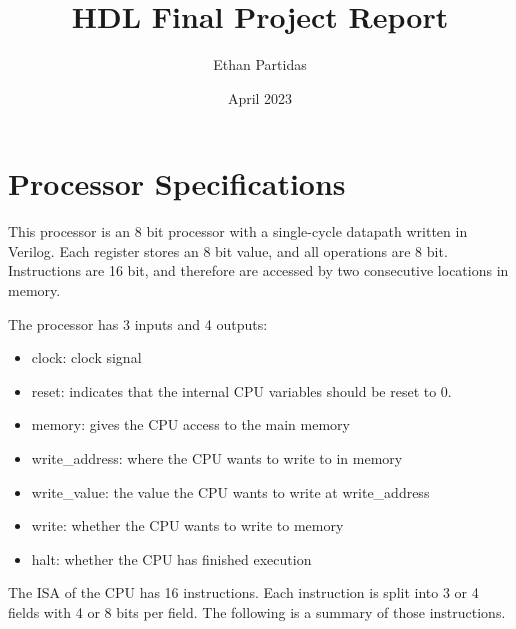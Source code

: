 \documentclass{article}
\title{HDL Final Project Report}
\author{Ethan Partidas}
\date{April 2023}
\begin{document}
\maketitle

\section{Processor Specifications}

This processor is an 8 bit processor with a single-cycle datapath written in Verilog. Each register stores an 8 bit value, and all operations are 8 bit. Instructions are 16 bit, and therefore are accessed by two consecutive locations in memory.

The processor has 3 inputs and 4 outputs:

\begin{itemize}
    \item clock: clock signal
    \item reset: indicates that the internal CPU variables should be reset to 0.
    \item memory: gives the CPU access to the main memory
    \item write\_address: where the CPU wants to write to in memory
    \item write\_value: the value the CPU wants to write at write\_address
    \item write: whether the CPU wants to write to memory
    \item halt: whether the CPU has finished execution
\end{itemize}

The ISA of the CPU has 16 instructions. Each instruction is split into 3 or 4 fields with 4 or 8 bits per field. The following is a summary of those instructions.

\centering
\end{document}
